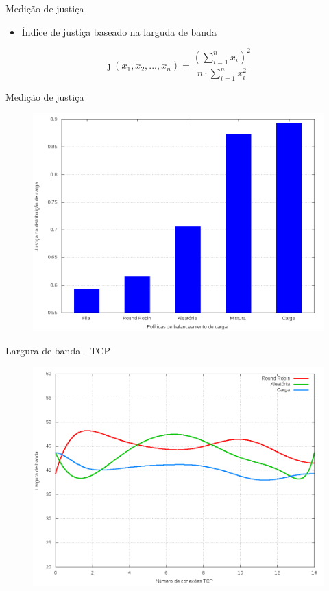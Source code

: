 \begin{frame}{Medição de justiça}
    \begin{itemize}
        \item Índice de justiça baseado na larguda de banda
    \end{itemize}
{\huge\centering
\[\jmath \left ( x_1, x_2,..., x_n \right ) = \frac{\left ( \sum_{i=1}^{n} x_i\right )^2}{n \cdot \sum_{i=1}^{n} x_i^2}\]
}
\end{frame}

\begin{frame}{Medição de justiça}

    \begin{figure}[htb!]
        \centering
        \includegraphics[scale=.35]{images/balancer-fairness}
    \end{figure}
\end{frame}


\begin{frame}{Largura de banda - TCP}

    \begin{figure}[htb!]
        \centering
        \includegraphics[scale=.35]{images/balancer-tcp-bandwidth}
    \end{figure}
\end{frame}



